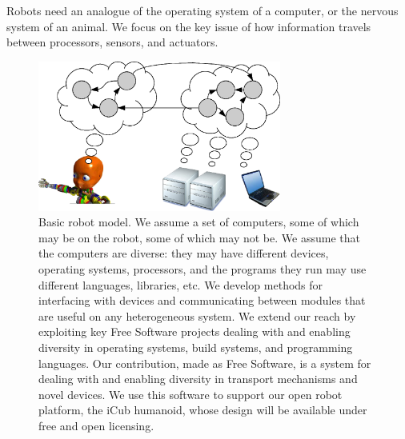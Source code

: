 


Robots need an analogue of the operating system of a computer, or the
nervous system of an animal.  We focus on the key issue of how information
travels between processors, sensors, and actuators.



\begin{figure}
\centerline{
\includegraphics[width=8cm]{fig-nethead}
}
\caption{
%
Basic robot model.  We assume a set of computers, some of which may be
on the robot, some of which may not be.  We assume that the computers
are diverse: they may have different devices, operating systems,
processors, and the programs they run may use different languages,
libraries, etc.  
%
We develop methods for interfacing with devices and communicating
between modules that are useful on any heterogeneous system.
%
We extend our reach by exploiting key Free Software projects
dealing with and enabling diversity in operating systems, build systems, 
and programming languages.
%
Our contribution, made as Free Software, is a system for dealing
with and enabling diversity in transport mechanisms and novel devices.
%
%
%
We use this software to support our open robot platform, the iCub
humanoid, whose design will be available under free and open
licensing.
%
}
\end{figure}





